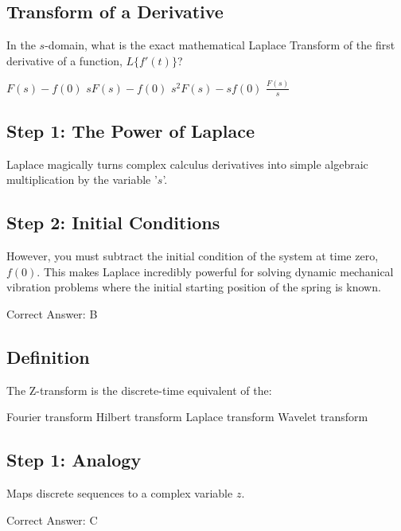 \subsection{Transform of a Derivative}

In the $s$-domain, what is the exact mathematical Laplace Transform of the first derivative of a function, $L\{f'(t)\}$?

\begin{choices}
    \choice $F(s) - f(0)$
    \correctchoice $s F(s) - f(0)$
    \choice $s^2 F(s) - s f(0)$
    \choice $\frac{F(s)}{s}$
\end{choices}

\begin{solution}

\subsection*{Step 1: The Power of Laplace}
Laplace magically turns complex calculus derivatives into simple algebraic multiplication by the variable '$s$'.

\subsection*{Step 2: Initial Conditions}
However, you must subtract the initial condition of the system at time zero, $f(0)$. This makes Laplace incredibly powerful for solving dynamic mechanical vibration problems where the initial starting position of the spring is known.

Correct Answer: B
\end{solution}

\clearpage

\subsection{Definition}

The Z-transform is the discrete-time equivalent of the:

\begin{choices}
    \choice Fourier transform
    \choice Hilbert transform
    \correctchoice Laplace transform
    \choice Wavelet transform
\end{choices}

\begin{solution}

\subsection*{Step 1: Analogy}
Maps discrete sequences to a complex variable $z$.

Correct Answer: C
\end{solution}

